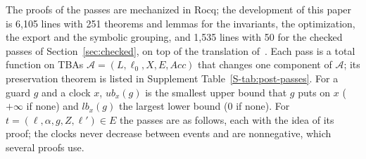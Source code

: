 \documentclass[preprint,12pt]{elsarticle}
\begin{document}
The proofs of the passes are mechanized in Rocq; the development of this paper is 6,105 lines with 251 theorems and lemmas for the invariants, the optimization, the export and the symbolic grouping, and 1,535 lines with 50 for the checked passes of Section~\ref{sec:checked}, on top of the translation of~\cite{faresmtl}. Each pass is a total function on TBAs $\mathcal A=(L,\ell_0,X,E,\mathit{Acc})$ that changes one component of $\mathcal A$; its preservation theorem is listed in Supplement Table~\ref{S-tab:post-passes}. For a guard $g$ and a clock $x$, $\mathit{ub}_x(g)$ is the smallest upper bound that $g$ puts on $x$ ($+\infty$ if none) and $\mathit{lb}_x(g)$ the largest lower bound ($0$ if none). For $t=(\ell,\alpha,g,Z,\ell')\in E$ the passes are as follows, each with the idea of its proof; the clocks never decrease between events and are nonnegative, which several proofs use.
\end{document}
